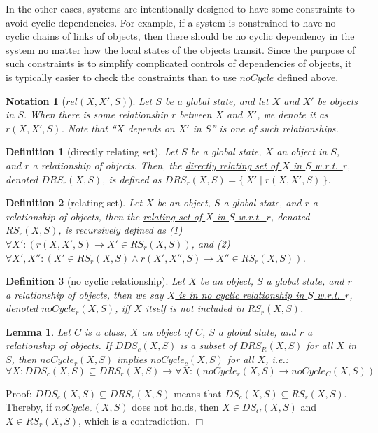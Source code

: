 \documentclass[12pt]{report}
\newtheorem{lemma}{Lemma}
\newtheorem{notation}{Notation}
\newtheorem{definition}{Definition}
\newcommand{\ra}{\rightarrow}
\newcommand{\ul}{\underline}
\begin{document}
In the other cases, systems are intentionally designed to have some constraints
to avoid cyclic dependencies. For example, if a system is constrained to
have no cyclic chains of links of objects, then there should be no
cyclic dependency in the system no matter how the local states of the
objects transit. Since the purpose of such constraints is to simplify
complicated controls of dependencies of objects, it is typically easier
to check the constraints than to use $noCycle$ defined above.

\begin{notation}[$rel(X,X',S)$]
  Let $S$ be a global state, and let $X$ and $X'$ be objects in $S$\!.  When
  there is some relationship $r$ between $X$ and $X'$, we denote it
  as \ul{$r(X,X',S)$}. Note that ``$X$ depends on $X'$ in $S$'' is one
  of such relationships.
\end{notation}

\begin{definition}[directly relating set]
Let $S$ be a global state, $X$ an object in $S$\!, and $r$ a
relationship of objects. Then, the \ul{directly relating set of $X$ in
  $S$ w.r.t.\ $r$}, denoted \ul{$\mathit{DRS_r}(X,S)$}, is defined as
$\mathit{DRS_r}(X,S)=\{~X'\mid r(X,X',S)~\}$.
\end{definition}

\begin{definition}[relating set]
Let $X$ be an object, $S$ a global state, and $r$ a relationship
of objects, then the \ul{relating set of $X$ in $S$
  w.r.t.\ $r$}, denoted \ul{$\mathit{RS_r}(X,S)$}, is recursively defined
as (1) $\forall X': (r(X,X',S) \ra X'\in \mathit{RS_r}(X,S))$, and (2)
$\forall X',X'': (X'\in \mathit{RS_r}(X,S) \land r(X',X'',S) \ra X''\in
\mathit{RS_r}(X,S))$.
\end{definition}

\begin{definition}[no cyclic relationship]
Let $X$ be an object, $S$ a global state, and $r$ a relationship
of objects, then we say \ul{$X$ is in no cyclic relationship in $S$
  w.r.t.\ $r$}, denoted \ul{$noCycle_r(X,S)$}, iff $X$ itself is not
included in $\mathit{RS_r}(X,S)$.
\end{definition}

\begin{lemma}
\label{lemma:simplerel}
Let $C$ is a class, $X$ an object of $C$, $S$ a global state,
and $r$ a relationship of objects. If $\mathit{DDS_c}(X,S)$ is a subset of
$\mathit{DRS_R}(X,S)$ for all $X$ in $S$\!, then $noCycle_r(X,S)$ implies
$noCycle_c(X,S)$ for all $X$, i.e.:
\[\forall X:\mathit{DDS_c}(X,S)\subseteq \mathit{DRS_r}(X,S) \ra \forall X: (noCycle_r(X,S) \ra
noCycle_C(X,S))\]
\end{lemma}
Proof: $\mathit{DDS_c}(X,S)\subseteq \mathit{DRS_r}(X,S)$ means that $\mathit{DS_c}(X,S)\subseteq
\mathit{RS_r}(X,S)$.  Thereby, if $noCycle_c(X,S)$ does not holds, then $X\in
\mathit{DS_C}(X,S)$ and $X\in \mathit{RS_r}(X,S)$, which is a contradiction. $\Box$\\
\end{document}
